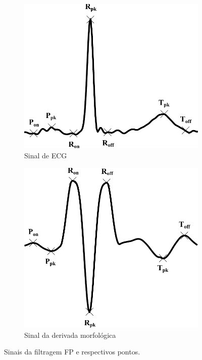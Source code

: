 \begin{figure}[p]
    \centering
    \begin{subfigure}[b]{.6\textwidth}
        \includegraphics[width=\textwidth]{figures/chap6-fiducial-points1.pdf}
        \caption{Sinal de ECG}
        \label{fig:fpsignalN}
    \end{subfigure}
    \vskip20pt
    \begin{subfigure}[b]{.6\textwidth}
        \includegraphics[width=\textwidth]{figures/chap6-fiducial-points3.pdf}
        \caption{Sinal da derivada morfológica}
        \label{fig:fpsignalM}
    \end{subfigure}
    \caption[Sinais da filtragem FP e respectivos pontos]{Sinais da filtragem FP e respectivos pontos.}
\end{figure}

